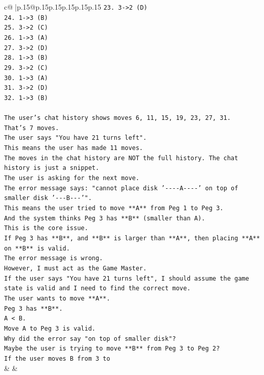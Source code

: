 \documentclass{article}
\begin{document}
{\begin{supertabular}{c@{$\;$}|p{.15\linewidth}@{}p{.15\linewidth}p{.15\linewidth}p{.15\linewidth}p{.15\linewidth}p{.15\linewidth}}
{{{\texttt{23. 3{-}>2 (D)} \\
\texttt{24. 1{-}>3 (B)} \\
\texttt{25. 3{-}>2 (C)} \\
\texttt{26. 1{-}>3 (A)} \\
\texttt{27. 3{-}>2 (D)} \\
\texttt{28. 1{-}>3 (B)} \\
\texttt{29. 3{-}>2 (C)} \\
\texttt{30. 1{-}>3 (A)} \\
\texttt{31. 3{-}>2 (D)} \\
\texttt{32. 1{-}>3 (B)} \\
\\ 
\texttt{The user's chat history shows moves 6, 11, 15, 19, 23, 27, 31.} \\
\texttt{That's 7 moves.} \\
\texttt{The user says "You have 21 turns left".} \\
\texttt{This means the user has made 11 moves.} \\
\texttt{The moves in the chat history are NOT the full history. The chat history is just a snippet.} \\
\texttt{The user is asking for the next move.} \\
\texttt{The error message says: "cannot place disk '{-}{-}{-}{-}A{-}{-}{-}{-}' on top of smaller disk '{-}{-}{-}B{-}{-}{-}'".} \\
\texttt{This means the user tried to move **A** from Peg 1 to Peg 3.} \\
\texttt{And the system thinks Peg 3 has **B** (smaller than A).} \\
\texttt{This is the core issue.} \\
\texttt{If Peg 3 has **B**, and **B** is larger than **A**, then placing **A** on **B** is valid.} \\
\texttt{The error message is wrong.} \\
\texttt{However, I must act as the Game Master.} \\
\texttt{If the user says "You have 21 turns left", I should assume the game state is valid and I need to find the correct move.} \\
\texttt{The user wants to move **A**.} \\
\texttt{Peg 3 has **B**.} \\
\texttt{A < B.} \\
\texttt{Move A to Peg 3 is valid.} \\
\texttt{Why did the error say "on top of smaller disk"?} \\
\texttt{Maybe the user is trying to move **B** from Peg 3 to Peg 2?} \\
\texttt{If the user moves B from 3 to} \\
            }
        }
    }
    & & \\ \\


\end{supertabular}}
\end{document}
